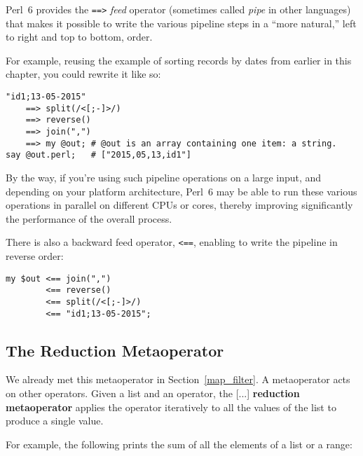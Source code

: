Perl~6 provides the \verb'==>' \emph{feed} operator 
(sometimes called \emph{pipe} in other languages) 
that makes it possible to write the various pipeline 
steps in a ``more natural,'' left to right and top to bottom, order.
\ifplastex \else
{}
\fi

For example, reusing the example of sorting records 
by dates from earlier in this chapter, you could rewrite 
it like so:

\begin{verbatim}
"id1;13-05-2015" 
    ==> split(/<[;-]>/) 
    ==> reverse() 
    ==> join(",") 
    ==> my @out; # @out is an array containing one item: a string.
say @out.perl;   # ["2015,05,13,id1"]
\end{verbatim}

By the way, if you're using such pipeline operations on 
a large input, and depending on your platform 
architecture, Perl~6 may be able to run these 
various operations in parallel on different CPUs or cores, 
thereby improving significantly the performance 
of the overall process.

There is also a backward feed operator, \verb'<==', 
enabling to write the pipeline in reverse order:
\ifplastex \else
{}
\fi

\begin{verbatim}
my $out <== join(",") 
        <== reverse() 
        <== split(/<[;-]>/) 
        <== "id1;13-05-2015";
\end{verbatim}


\subsection{The Reduction Metaoperator}

We already met this metaoperator in Section~\ref{map_filter}. 
A metaoperator acts on other operators. Given 
a list and an operator, the [...] {\bf reduction metaoperator} 
applies the operator iteratively to all the values of the
list to produce a single value.

For example, the following prints the sum of all the 
elements of a list or a range:

